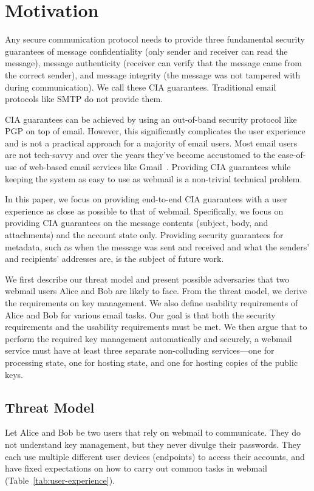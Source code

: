 \section{Motivation}
\label{sec:motivation}

Any secure communication protocol needs to provide three 
fundamental security guarantees of message confidentiality 
(only sender and receiver can read the message), message 
authenticity (receiver can verify that the message came 
from the correct sender), and message integrity (the message 
was not tampered with during communication). We call these 
CIA guarantees. Traditional email protocols like SMTP do not
provide them.

CIA guarantees can be achieved by using an out-of-band security 
protocol like PGP on top of email. However, this significantly 
complicates the user experience and is not a practical approach 
for a majority of email users. Most email users are not tech-savvy 
and over the years they’ve become accustomed to the ease-of-use of 
web-based email services like Gmail~\cite{GMail}. Providing CIA 
guarantees while keeping the system as easy to use as webmail is 
a non-trivial technical problem. 

In this paper, we focus on providing end-to-end CIA guarantees 
with a user experience as close as possible to that of webmail. 
Specifically, we focus on providing CIA guarantees on the message 
contents (subject, body, and attachments) and the account state only. 
Providing security guarantees for metadata, such as when the message 
was sent and received and what the senders’ and recipients’ addresses 
are, is the subject of future work.

We first describe our threat model and present possible adversaries 
that two webmail users Alice and Bob are likely to face. From the 
threat model, we derive the requirements on key management. We also 
define usability requirements of Alice and Bob for various email tasks.
 Our goal is that both the security requirements and the usability 
requirements must be met. We then argue that to perform the required 
key management automatically and securely, a webmail service must 
have at least three separate non-colluding services---one for processing 
state, one for hosting state, and one for hosting copies of the public keys. 

\subsection{Threat Model}
Let Alice and Bob be two users that rely on webmail to communicate.  They do not understand key management, but they never divulge their passwords. They each use multiple different user devices (endpoints) to access their accounts, and have fixed expectations on how to carry out common tasks in webmail (Table~\ref{tab:user-experience}).

